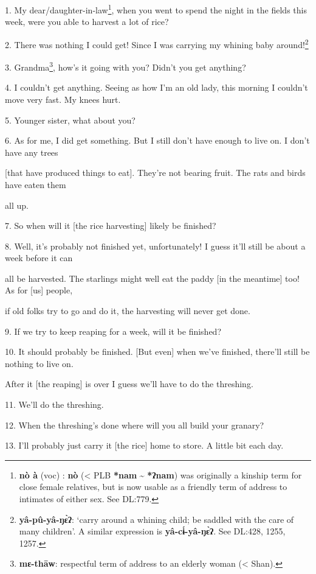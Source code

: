 \setcounter{footnote}{0}

1. My dear/daughter-in-law\footnote{\textbf{nò à} (voc) : \textbf{nò} (< PLB \textbf{*nam } \~{} \textbf{ *ʔnam}) was originally a kinship term for close female relatives, but is now usable as a friendly term of address to intimates of either sex. See DL:779.}, when you went to spend the night in the fields this week, were
you able to harvest a lot of rice?

2. There was nothing I could get! Since I was carrying my whining baby around!\footnote{\textbf{yâ-pû-yâ-ŋɛ̀ʔ}: `carry around a whining child; be saddled with the care of many children'. A similar expression is \textbf{yâ-cɨ́-yâ-ŋɛ̀ʔ}. See DL:428, 1255, 1257.}

3. Grandma\footnote{\textbf{mɛ-thāw}: respectful term of address to an elderly woman (< Shan).}, how's it going with you? Didn't you get anything?

4. I couldn't get anything. Seeing as how I'm an old lady, this morning I couldn't
move very fast. My knees hurt.

5. Younger sister, what about you?

6. As for me, I did get something. But I still don't have enough to live on. I
don't have any trees

[that have produced things to eat]. They're not bearing fruit. The rats and birds
have eaten them

all up.

7. So when will it [the rice harvesting] likely be finished?

8. Well, it's probably not finished yet, unfortunately! I guess it'll still be
about a week before it can

all be harvested. The starlings might well eat the paddy [in the meantime] too!
As for [us] people,

if old folks try to go and do it, the harvesting will never get done.

9. If we try to keep reaping for a week, will it be finished?

10. It should probably be finished. [But even] when we've finished, there'll still
be nothing to live on.

After it [the reaping] is over I guess we'll have to do the threshing.

11. We'll do the threshing.

12. When the threshing's done where will you all build your granary?

13. I'll probably just carry it [the rice] home to store. A little bit each day.

